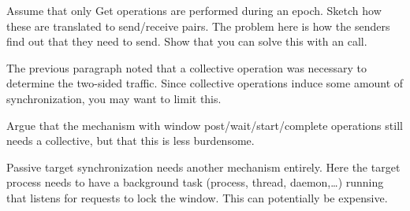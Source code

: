 \begin{exercise}
  Assume that only Get operations are performed during an epoch. 
  Sketch how these are translated to send/receive pairs. 
  The problem here is how the senders find out that they need to send.
  Show that you can solve this with an  call.
\end{exercise}

The previous paragraph noted that a collective operation was necessary
to determine the two-sided traffic. Since collective operations induce
some amount of synchronization, you may want to limit this.

\begin{exercise}
  Argue that the mechanism with window post/wait/start/complete operations
  still needs a collective, but that this is less burdensome.
\end{exercise}

Passive target synchronization needs another mechanism entirely.  Here
the target process needs to have a background task (process, thread,
daemon,\ldots) running that listens for requests to lock the
window. This can potentially be expensive.


